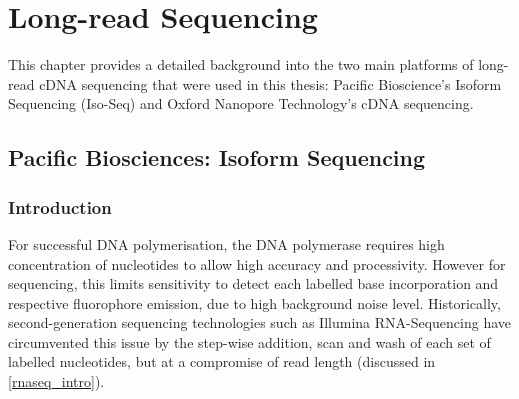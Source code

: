 \chapter{Long-read Sequencing}\label{ch: long_read_sequencing}

This chapter provides a detailed background into the two main platforms of long-read cDNA sequencing that were used in this thesis: Pacific Bioscience's Isoform Sequencing (Iso-Seq) and Oxford Nanopore Technology's cDNA sequencing.  

\section{Pacific Biosciences: Isoform Sequencing}
\label{sec:pb_isoform_sequencing}

\subsection{Introduction}
For successful DNA polymerisation, the DNA polymerase requires high concentration of nucleotides to allow high accuracy and processivity.  However for sequencing, this limits sensitivity to detect each labelled base incorporation and respective fluorophore emission, due to high background noise level. Historically, second-generation sequencing technologies such as Illumina RNA-Sequencing have circumvented this issue by the step-wise addition, scan and wash of each set of labelled nucleotides, but at a compromise of read length (discussed in \cref{rnaseq_intro}). 

